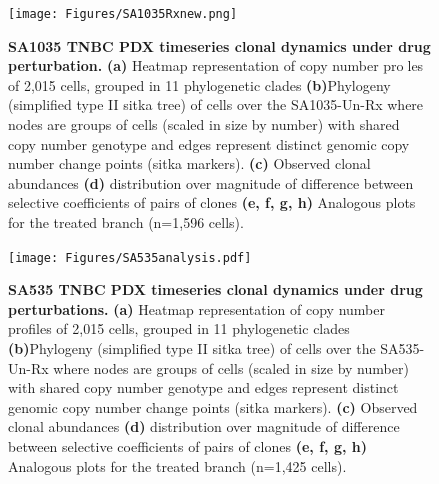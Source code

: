 \begin{figure}
\centering
\texttt{[image: Figures/SA1035Rxnew.png]}
	
\caption[SA1035 TNBC PDX timeseries clonal dynamics under drug perturbation]
	{\small
	\textbf{SA1035 TNBC PDX timeseries clonal dynamics under drug perturbation.}
	    \textbf{(a)} Heatmap representation of copy number proles of
2,015 cells, grouped in 11 phylogenetic clades  \textbf{(b)}Phylogeny (simplified type II sitka tree) of cells over the SA1035-Un-Rx where nodes are groups of cells (scaled in size by number) with shared copy number genotype and edges represent distinct genomic copy number change points (sitka markers). \textbf{(c)} Observed clonal abundances \textbf{(d)} distribution over magnitude of difference between selective coefficients of pairs of clones \textbf{(e, f, g, h)} Analogous plots for the treated branch (n=1,596 cells).
	}
	\label{fig:SA1035Rxnew}
\end{figure}



\begin{figure}
\centering
\texttt{[image: Figures/SA535analysis.pdf]}
	
\caption[SA535 TNBC PDX timeseries clonal dynamics under drug perturbations]
	{\small
	\textbf{SA535 TNBC PDX timeseries clonal dynamics under drug perturbations.}
	     \textbf{(a)} Heatmap representation of copy number profiles of
2,015 cells, grouped in 11 phylogenetic clades  \textbf{(b)}Phylogeny (simplified type II sitka tree) of cells over the SA535-Un-Rx where nodes are groups of cells (scaled in size by number) with shared copy number genotype and edges represent distinct genomic copy number change points (sitka markers). \textbf{(c)} Observed clonal abundances \textbf{(d)} distribution over magnitude of difference between selective coefficients of pairs of clones \textbf{(e, f, g, h)} Analogous plots for the treated branch (n=1,425 cells).
	}
	\label{fig:SA535analysis}
\end{figure}



